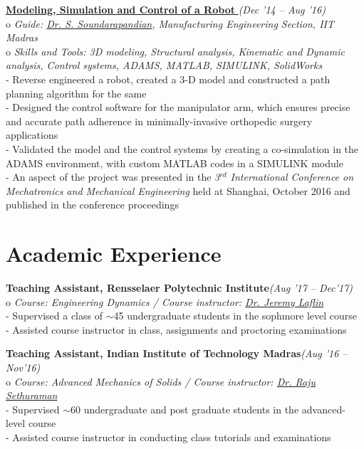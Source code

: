 \documentclass[margin,line]{res}
\begin{document}
\begin{resume}
\textbullet\hspace{0.005cm} \href{https://sites.google.com/site/vigneshsrinivasaragavan/research}{{\bf Modeling, Simulation and Control of a Robot }}\hfill {\em (Dec '14 -- Aug '16)}\\
o {\em Guide: \href {https://home.iitm.ac.in/sspandian/} {\color{RoyalPurple} Dr. S. Soundarapandian}, Manufacturing Engineering Section, IIT Madras}\\
o {\em Skills and Tools: 3D modeling, Structural analysis, Kinematic and Dynamic analysis, Control systems, ADAMS, MATLAB, SIMULINK, SolidWorks}\\
- Reverse engineered a robot, created a 3-D model and constructed a path planning algorithm for the same \\
- Designed the control software for the manipulator arm, which ensures precise and accurate path adherence in minimally-invasive orthopedic surgery applications \\
- Validated the model and the control systems by creating a co-simulation in the ADAMS environment, with custom MATLAB codes in a SIMULINK module \\
- An aspect of the project was presented in the {\em 3$^{rd}$ International Conference on Mechatronics and Mechanical Engineering} held at Shanghai, October 2016 and published in the conference proceedings

\section {\sc Academic Experience}
\textbullet\hspace{0.005cm} {\bf Teaching Assistant, Rensselaer Polytechnic Institute}\hfill {\em (Aug '17 -- Dec'17)}\\
o {\em Course: Engineering Dynamics / Course instructor: \href {} {\color{RoyalPurple} Dr. Jeremy Laflin}}\\
- Supervised a class of $\sim$45 undergraduate students in the sophmore level course\\
- Assisted course instructor in class, assignments and proctoring examinations

\textbullet\hspace{0.005cm} {\bf Teaching Assistant, Indian Institute of Technology Madras}\hfill {\em (Aug '16 -- Nov'16)}\\
o {\em Course: Advanced Mechanics of Solids / Course instructor: \href {https://mech.iitm.ac.in/meiitm/personnal/raju-sethuraman/} {\color{RoyalPurple} Dr. Raju Sethuraman}}\\
- Supervised $\sim$60 undergraduate and post graduate students in the advanced-level course\\
- Assisted course instructor in conducting class tutorials and examinations


\end{resume}
\end{document}
